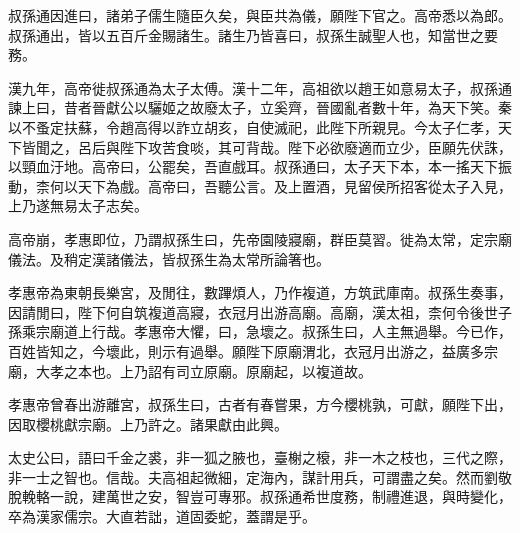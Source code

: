 叔孫通因進曰，諸弟子儒生隨臣久矣，與臣共為儀，願陛下官之。高帝悉以為郎。叔孫通出，皆以五百斤金賜諸生。諸生乃皆喜曰，叔孫生誠聖人也，知當世之要務。

漢九年，高帝徙叔孫通為太子太傅。漢十二年，高祖欲以趙王如意易太子，叔孫通諫上曰，昔者晉獻公以驪姬之故廢太子，立奚齊，晉國亂者數十年，為天下笑。秦以不蚤定扶蘇，令趙高得以詐立胡亥，自使滅祀，此陛下所親見。今太子仁孝，天下皆聞之，呂后與陛下攻苦食啖，其可背哉。陛下必欲廢適而立少，臣願先伏誅，以頸血汙地。高帝曰，公罷矣，吾直戲耳。叔孫通曰，太子天下本，本一搖天下振動，柰何以天下為戲。高帝曰，吾聽公言。及上置酒，見留侯所招客從太子入見，上乃遂無易太子志矣。

高帝崩，孝惠即位，乃謂叔孫生曰，先帝園陵寢廟，群臣莫習。徙為太常，定宗廟儀法。及稍定漢諸儀法，皆叔孫生為太常所論箸也。

孝惠帝為東朝長樂宮，及閒往，數蹕煩人，乃作複道，方筑武庫南。叔孫生奏事，因請閒曰，陛下何自筑複道高寢，衣冠月出游高廟。高廟，漢太祖，柰何令後世子孫乘宗廟道上行哉。孝惠帝大懼，曰，急壞之。叔孫生曰，人主無過舉。今已作，百姓皆知之，今壞此，則示有過舉。願陛下原廟渭北，衣冠月出游之，益廣多宗廟，大孝之本也。上乃詔有司立原廟。原廟起，以複道故。

孝惠帝曾春出游離宮，叔孫生曰，古者有春嘗果，方今櫻桃孰，可獻，願陛下出，因取櫻桃獻宗廟。上乃許之。諸果獻由此興。

太史公曰，語曰千金之裘，非一狐之腋也，臺榭之榱，非一木之枝也，三代之際，非一士之智也。信哉。夫高祖起微細，定海內，謀計用兵，可謂盡之矣。然而劉敬脫輓輅一說，建萬世之安，智豈可專邪。叔孫通希世度務，制禮進退，與時變化，卒為漢家儒宗。大直若詘，道固委蛇，蓋謂是乎。
